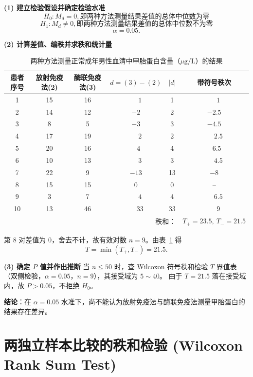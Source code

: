 \documentclass[lang=cn,10pt]{elegantbook}
\begin{document}
\vspace{0.2cm}
\begin{solution}
\textbf{(1) 建立检验假设并确定检验水准}
\[
H_0: M_d = 0 ,即两种方法测量结果差值的总体中位数为零
\]
\[
H_1: M_d \ne 0,即两种方法测量结果差值的总体中位数不为零
\]
\[
\alpha=0.05.
\]

\textbf{(2) 计算差值、编秩并求秩和统计量}
\begin{table}[htbp]
\centering
\caption{两种方法测量正常成年男性血清中甲胎蛋白含量（$\mu\mathrm{g}/\mathrm{L}$）的结果}
\label{tab:afp-raw}
\begin{tabular}{cccccc}
\toprule
患者序号 & 放射免疫法(2) & 酶联免疫法(3) & $d=(3)-(2)$ & $|d|$ & 带符号秩次 \\
\midrule
1  & 15 & 16 & $\phantom{-}1$  & 1  & $\phantom{-}1$ \\
2  & 14 & 12 & $-2$  & 2  & $-2.5$ \\
3  & 8  & 5  & $-3$  & 3  & $-4.5$ \\
4  & 17 & 19 & $\phantom{-}2$  & 2  & $\phantom{-}2.5$ \\
5  & 20 & 16 & $-4$  & 4  & $-6.5$ \\
6  & 10 & 13 & $\phantom{-}3$  & 3  & $\phantom{-}4.5$ \\
7  & 22 & 9  & $-13$ & 13 & $-8$ \\
8  & 15 & 15 & 0 & 0 & -- \\
9  & 3  & 7  & $\phantom{-}4$  & 4  & $\phantom{-}6.5$ \\
10 & 13 & 46 & $\phantom{-}33$ & 33 & $\phantom{-}9$ \\
\midrule
\multicolumn{5}{r}{秩和：} & $T_+=23.5,\ T_-=21.5$ \\
\bottomrule
\end{tabular}
\end{table}

第 8 对差值为 0，舍去不计，故有效对数 $n=9$。由表~\ref{tab:afp-raw} 得
\[
T=\min(T_+,T_-)=21.5.
\]

\textbf{(3) 确定 $P$ 值并作出推断}
当 $n\le 50$ 时，查 Wilcoxon 符号秩和检验 $T$ 界值表（双侧检验，$\alpha=0.05$，$n=9$），其接受域为 $5\sim 40$。
由于 $T=21.5$ 落在接受域内，故 $P>0.05$，不拒绝 $H_0$。

\textbf{结论}：在 $\alpha=0.05$ 水准下，尚不能认为放射免疫法与酶联免疫法测量甲胎蛋白的结果存在差异。
\end{solution}

\section{两独立样本比较的秩和检验 (Wilcoxon Rank Sum Test)}
\end{document}
